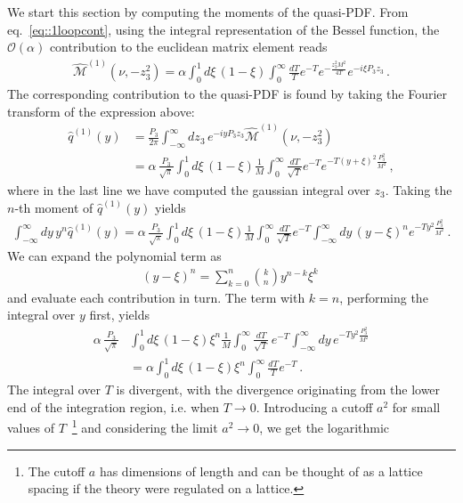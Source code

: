 We start this section by computing the moments of the quasi-PDF. From
eq.~\eqref{eq::1loopcont}, using the integral representation of the Bessel
function, the $\mathcal{O}\left(\alpha\right)$ contribution to the euclidean
matrix element reads
 \begin{align}
    \hat{\mathcal{M}}^{(1)}\left(\nu, -z_3^2\right) = 
    \alpha\int_0^{1} d\xi \, \left(1-\xi\right) \int_0^{\infty}\frac{dT}{T} e^{-T} e^{-\frac{z_3^2 M^2}{4T}} e^{-i\xi P_3 z_3}\, .
\end{align}
The corresponding contribution to the quasi-PDF is found by taking the Fourier
transform of the expression above:
\begin{align}
    \hat{q}^{(1)}\left(y\right) &= 
    \frac{P_3}{2\pi}\int_{-\infty}^{\infty}d z_3\, e^{-i y P_3 z_3 } \hat{\mathcal{M}}^{(1)}\left(\nu, -z_3^2\right) \\
    & = \alpha\,\frac{P_3}{\sqrt{\pi}}\int_0^1 d\xi \, \left(1-\xi\right)\frac{1}{M} 
	\int_0^{\infty} \frac{dT}{\sqrt{T}}e^{-T} e^{-T\left(y+\xi\right)^2 \frac{P_3^2}{M^2}}\, ,
\end{align}
where in the last line we have computed the gaussian integral over $z_3$.
Taking the $n$-th moment of $\hat{q}^{(1)}\left(y\right)$ yields
\begin{align}
    \int_{-\infty}^{\infty} dy\, y^n \hat{q}^{(1)}\left(y\right) =
	\alpha\,\frac{P_3}{\sqrt{\pi}}\int_0^1 d\xi \, \left(1-\xi\right)
	\frac{1}{M} \int_0^{\infty} \frac{dT}{\sqrt{T}}e^{-T}
	\int_{-\infty}^{\infty} dy\, 
	\left(y-\xi\right)^n e^{-T y^2 \frac{P_3^2}{M^2}}\, .
\end{align}
We can expand the polynomial term as
\begin{align}
	\left(y-\xi\right)^n = \sum_{k=0}^{n}\binom{k}{n}y^{n-k}\xi^k\
\end{align}
and evaluate each contribution in turn. The term with $k=n$, performing the
integral over $y$ first, yields
\begin{align}
	 \alpha\,\frac{P_3}{\sqrt{\pi}}&\int_0^1 d\xi\, 
	 \left(1-\xi\right) \xi^n \frac{1}{M}
	 \int_0^{\infty} \frac{dT}{\sqrt{T}}\, e^{-T } 
	 \int_{-\infty}^{\infty} dy\, e^{-T y^2 \frac{P_3^2}{M^2}}  \\
	 & = \alpha \int_0^1 d\xi\, 
	 \left(1-\xi\right) \xi^n \int_0^{\infty} \frac{dT}{T}e^{-T}\, . 
\end{align}
The integral over $T$ is divergent, with the divergence originating from the
lower end of the integration region, i.e. when $T\to 0$. Introducing a cutoff
$a^2$ for small values of $T$~\footnote{The cutoff $a$ has dimensions of length
and can be thought of as a lattice spacing if the theory were regulated on a
lattice.} and considering the limit $a^2 \rightarrow 0$, we get the logarithmic
